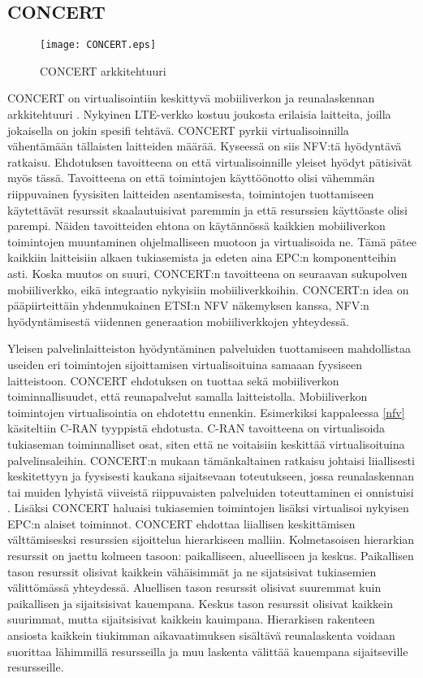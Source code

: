 \subsection{CONCERT} \label{concert}

\begin{figure}[tb]
\texttt{[image: CONCERT.eps]}
\caption{CONCERT arkkitehtuuri} \label{fig:concert}
\end{figure}


CONCERT on virtualisointiin keskittyvä mobiiliverkon ja reunalaskennan arkkitehtuuri \cite{liu2014concert}.
Nykyinen LTE-verkko kostuu joukosta erilaisia laitteita, joilla jokaisella on jokin spesifi tehtävä.
CONCERT pyrkii virtualisoinnilla vähentämään tällaisten laitteiden määrää.
Kyseessä on siis NFV:tä hyödyntävä ratkaisu.
Ehdotuksen tavoitteena on että virtualisoinnille yleiset hyödyt pätisivät myös tässä.
Tavoitteena on että toimintojen käyttöönotto olisi vähemmän riippuvainen fyysisiten laitteiden asentamisesta, toimintojen tuottamiseen käytettävät resurssit skaalautuisivat paremmin ja että resurssien käyttöaste olisi parempi.
Näiden tavoitteiden ehtona on käytännössä kaikkien mobiiliverkon toimintojen muuntaminen ohjelmalliseen muotoon ja virtualisoida ne.
Tämä pätee kaikkiin laitteisiin alkaen tukiasemista ja edeten aina EPC:n komponentteihin asti.
Koska muutos on suuri, CONCERT:n tavoitteena on seuraavan sukupolven mobiiliverkko, eikä integraatio nykyisiin mobiiliverkkoihin.
CONCERT:n idea on pääpiirteittäin yhdenmukainen ETSI:n NFV näkemyksen \cite{etsinfv5g} kanssa, NFV:n hyödyntämisestä viidennen generaation mobiiliverkkojen yhteydessä.

Yleisen palvelinlaitteiston hyödyntäminen palveluiden tuottamiseen mahdollistaa useiden eri toimintojen sijoittamisen virtualisoituina samaaan fyysiseen laitteistoon.
CONCERT ehdotuksen on tuottaa sekä mobiiliverkon toiminnallisuudet, että reunapalvelut samalla laitteistolla. 
Mobiiliverkon toimintojen virtualisointia on ehdotettu ennenkin. Esimerkiksi kappaleessa \ref{nfv} käsiteltiin C-RAN tyyppistä ehdotusta. C-RAN tavoitteena on virtualisoida tukiaseman toiminnalliset osat, siten että ne voitaisiin keskittää virtualisoituina palvelinsaleihin. 
CONCERT:n mukaan tämänkaltainen ratkaisu johtaisi liiallisesti keskitettyyn ja fyysisesti kaukana sijaitsevaan toteutukseen, jossa reunalaskennan tai muiden lyhyistä viiveistä riippuvaisten palveluiden toteuttaminen ei onnistuisi \cite{liu2014concert}. Lisäksi CONCERT haluaisi tukiasemien toimintojen lisäksi virtualisoi nykyisen EPC:n alaiset toiminnot.
CONCERT ehdottaa liiallisen keskittämisen välttämisesksi resurssien sijoittelua hierarkiseen malliin.
Kolmetasoisen hierarkian resurssit on jaettu kolmeen tasoon: paikalliseen, alueelliseen ja keskus. 
Paikallisen tason resurssit olisivat kaikkein vähäisimmät ja ne sijatsisivat tukiasemien välittömässä yhteydessä.
Aluellisen tason resurssit olisivat suuremmat kuin paikallisen ja sijaitsisivat kauempana.
Keskus tason resurssit olisivat kaikkein suurimmat, mutta sijaitsisivat kaikkein kauimpana. 
Hierarkisen rakenteen ansiosta kaikkein tiukimman aikavaatimuksen sisältävä reunalaskenta voidaan suorittaa lähimmillä resursseilla ja muu laskenta välittää kauempana sijaitseville resursseille.

